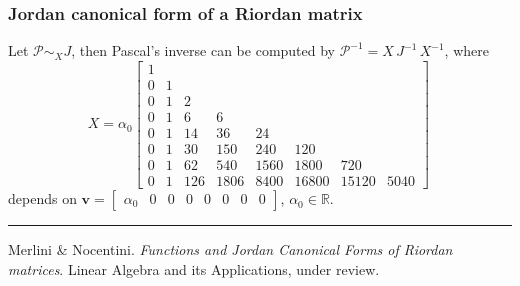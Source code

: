 \documentclass[9pt]{beamer}
\begin{document}
\begin{frame}[fragile]
\frametitle{Jordan canonical form of a Riordan matrix}
Let $\mathcal{P}\sim_{X}J$, then Pascal's inverse can be computed by
$\mathcal{P}^{-1} = X\,J^{-1}\,X^{-1}$, where
\begin{displaymath}
X = \alpha_{0} \left[\begin{matrix}1 &  &  &  &  &  &  & \\0 & 1 &  &  &  &  &  & \\0 & 1 & 2 &  &  &  &  & \\0 & 1 & 6 & 6 &  &  &  & \\0 & 1 & 14 & 36 & 24 &  &  & \\0 & 1 & 30 & 150 & 240 & 120 &  & \\0 & 1 & 62 & 540 & 1560 & 1800 & 720 & \\0 & 1 & 126 & 1806 & 8400 & 16800 & 15120 & 5040\end{matrix}\right]\,
\end{displaymath}
depends on $\displaystyle\boldsymbol{v}= \left[\begin{matrix} \alpha_{0} & 0 &
0 & 0 & 0 & 0 & 0 & 0 \end{matrix}\right]$, $\alpha_{0}\in\mathbb{R}$.
\vfill
\noindent\rule{\textwidth}{0.1pt}
{\footnotesize
Merlini \& Nocentini. \textit{Functions and Jordan Canonical Forms of Riordan
matrices}. \newline Linear Algebra and its Applications, under review.}
\end{frame}
\end{document}
